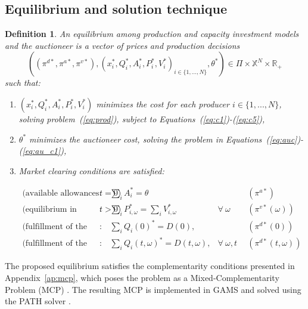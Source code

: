 \documentclass[11pt, letterpaper]{article}
\newtheorem{definition}{\sc Definition}
\begin{document}
\subsection{Equilibrium and solution technique}\label{sec:equi}


\begin{definition}
An equilibrium among production and capacity investment models and the auctioneer is a vector of prices and production decisions $$\left((\pi^{d*},\pi^{a*},\pi^{v*}),(x_i^*,Q_i^*,A_i^*,P_i^*,V_i^*)_{i\in\{1,...,N\}},\theta^*\right)\in\Pi\times\mathbb{X}^N \times \mathbb{R}_+$$ such that:

\begin{enumerate}
    \item $(x_i^*,Q_i^*,A_i^*,P_i^*,V_i^*)$ minimizes the cost for each producer  $i\in\{1,...,N\}$, solving problem~(\ref{eq:prod}), subject to Equations~(\ref{eq:c1})-(\ref{eq:c5}),
    \item $\theta^*$ minimizes the auctioneer cost, solving the problem in Equations~(\ref{eq:auc})-(\ref{eq:au_c1}),
    \item Market clearing conditions are satisfied:
    
\begin{align}
\textrm{(available allowances $t=0$)}: &  \ \   \sum_{i} A_{i}^* = \theta   &  & \ \  (\pi^{a*})\\
\textrm{(equilibrium in trading market $t>0$)}: &   \ \  \sum_{i} P_{i,\omega}^* = \sum_{i} V_{i,\omega}^* & \forall \ \omega & \ \ \left(\pi^{v*}(\omega)\right) \\
\textrm{(fulfillment of the demand --first stage)}:  &   \ \  \sum_{i} Q_i(0)^* = D(0), &  & \ \ (\pi^{d*}(0))\\
\textrm{(fulfillment of the demand --second stage)}:  &   \ \  \sum_{i} Q_i(t,\omega)^* = D(t,\omega), & \forall \ \omega, t& \ \ (\pi^{d*}(t,\omega))
\end{align}
\end{enumerate}
\end{definition}

The proposed equilibrium satisfies the complementarity conditions presented in Appendix~\ref{ap:mcp}, which poses the problem as a Mixed-Complementarity Problem (MCP) \cite{murphy2016tutorial,feijoo2016north}. The resulting MCP is implemented in GAMS and solved using the PATH solver \cite{Ferris2000}.
\end{document}
